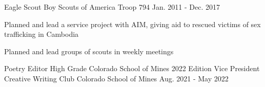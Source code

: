 

\begin{cventries}
  \cventry
    {Eagle Scout}
    {Boy Scouts of America}
    {Troop 794}
    {Jan. 2011 - Dec. 2017}
    {
      \begin{cvitems}
        \item{Planned and lead a service project with AIM, giving aid to rescued victims of sex trafficking in Cambodia}
        \item{Planned and lead groups of scouts in weekly meetings}
      \end{cvitems}
    }
  \cventry
    {Poetry Editor}
    {High Grade}
    {Colorado School of Mines}
    {2022 Edition}
    {
    }
  \cventry
    {Vice President}
    {Creative Writing Club}
    {Colorado School of Mines}
    {Aug. 2021 - May 2022}
    {
    }




\end{cventries}
